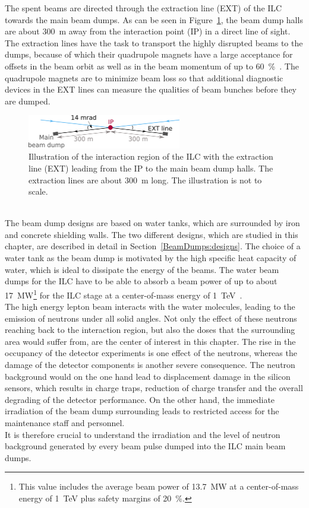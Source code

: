 The spent \positron\electron beams are directed through the extraction line (EXT) of the ILC towards the main beam dumps. 
As can be seen in Figure~\ref{fig:BeamDumps:IP_to_Dump}, the beam dump halls are about \SI{300}{\meter} away from the interaction point (IP) in a direct line of sight.
The extraction lines have the task to transport the highly disrupted beams to the dumps, because of which their quadrupole magnets have a large acceptance for offsets in the beam orbit as well as in the beam momentum of up to \SI{60}{\percent}~\cite[p. 139]{TDR32}.
The quadrupole magnets are to minimize beam loss so that additional diagnostic devices in the EXT lines can measure the qualities of beam bunches before they are dumped.
\begin{figure}
\centering
\includegraphics[width=0.6\textwidth]{Figures/BeamDump/IP_EXT.png}
\caption[Schematic of the ILC interaction region with extraction line]{Illustration of the interaction region of the ILC with the extraction line (EXT) leading from the IP to the main beam dump halls.
The extraction lines are about \SI[detect-all]{300}{\meter} long.
The illustration is not to scale.}
\label{fig:BeamDumps:IP_to_Dump}
\end{figure}
\\The beam dump designs are based on water tanks, which are surrounded by iron and concrete shielding walls. 
The two different designs, which are studied in this chapter, are described in detail in Section~\ref{BeamDumps:designs}.
The choice of a water tank as the beam dump is motivated by the high specific heat capacity of water, which is ideal to dissipate the energy of the beams. 
The water beam dumps for the ILC have to be able to absorb a beam power of up to about \SI{17}{\mega\watt}\footnote{This value includes the average beam power of \SI{13.7}{\mega\watt} at a center-of-mass energy of \SI{1}{\TeV} plus safety margins of \SI{20}{\percent}.} for the ILC stage at a center-of-mass energy of \SI{1}{\TeV}~\cite{BeamDumpSpecs}.
\\The high energy lepton beam interacts with the water molecules, leading to the emission of neutrons under all solid angles. 
Not only the effect of these neutrons reaching back to the interaction region, but also the doses that the surrounding area would suffer from, are the center of interest in this chapter. 
The rise in the occupancy of the detector experiments is one effect of the neutrons, whereas the damage of the detector components is another severe consequence.
The neutron background would on the one hand lead to displacement damage in the silicon sensors, which results in charge traps, reduction of charge transfer and the overall degrading of the detector performance. 
On the other hand, the immediate irradiation of the beam dump surrounding leads to restricted access for the maintenance staff and personnel.
\\It is therefore crucial to understand the irradiation and the level of neutron background generated by every beam pulse dumped into the ILC main beam dumps.

